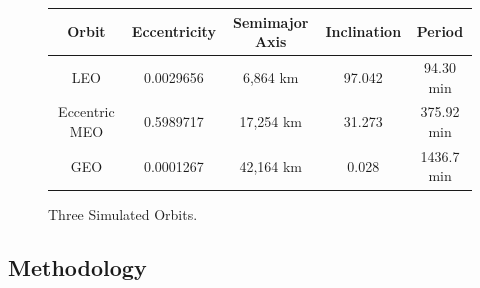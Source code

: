 
\begin{figure}
	\begin{center}
		\begin{tabular}{| c | c | c | c | c |}
		\hline Orbit  & Eccentricity & Semimajor Axis & Inclination & Period\\
		\hline LEO & 0.0029656 & 6,864 km & 97.042 & 94.30 min\\
		\hline Eccentric MEO & 0.5989717 & 17,254 km & 31.273 & 375.92 min\\
		\hline GEO & 0.0001267 & 42,164 km & 0.028 & 1436.7 min \\
		\hline
		\end{tabular}
	\end{center}
	\caption{Three Simulated Orbits.}
\end{figure}

		

\subsection{Methodology}


